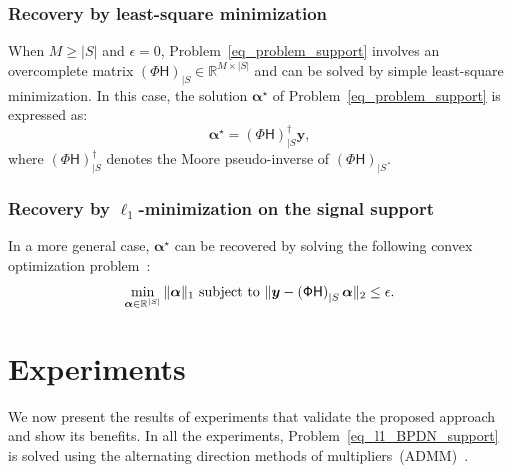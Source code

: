\documentclass{article}
\newcommand{\vect}[1]{\bm{#1}}
\newcommand{\mat}[1]{\mathsf{#1}}
\theoremstyle{definition}
\begin{document}
\subsubsection{Recovery by least-square minimization}
\label{subsec_ls_recovery}
When $M \geq |S|$ and $\epsilon=0$, Problem~\eqref{eq_problem_support} involves an overcomplete matrix $\left(\mat{\Phi H}\right)_{|S} \in \mathbb{R}^{M \times |S|}$ and can be solved by simple least-square minimization. 
In this case, the solution $\vect{\alpha}^\star$ of Problem~\eqref{eq_problem_support} is expressed as:
\begin{equation}
\label{eq_solution_LS}
	\vect{\alpha}^\star = \left(\mat{\Phi H}\right)_{|S}^\dagger  \vect{y},
\end{equation}
where $\left(\mat{\Phi H}\right)_{|S}^\dagger$ denotes the Moore pseudo-inverse of $\left(\mat{\Phi H}\right)_{|S}$.
\subsubsection{Recovery by $\ell_1$-minimization on the signal support}
\label{subsec_ls_recovery}
In a more general case, $\vect{\alpha}^\star$ can be recovered by solving the following convex optimization problem~\cite{candes11}:
\begin{equation}
\label{eq_l1_BPDN_support}
\min_{\vect{\alpha} \in \mathbb{R}^{|S|}}\|\vect{\alpha}\|_{1}
\textnormal{ subject to }\| \bm{y}-\left(\mat{\Phi H}\right)_{|S}\vect{\alpha}\|_{2}\leq\epsilon.
\end{equation}
\section{Experiments}
\label{sec_exp}
We now present the results of experiments that validate the proposed approach and show its benefits.
In all the experiments, Problem~\eqref{eq_l1_BPDN_support} is solved using the alternating direction methods of multipliers~(ADMM)~\cite{Boyd2010}.
\end{document}
